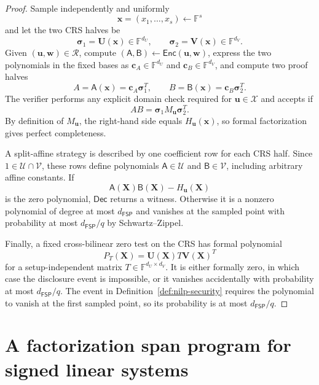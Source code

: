 \documentclass[11pt]{article}
\theoremstyle{definition}
\newcommand{\F}{\mathbb F}
\newcommand{\cR}{\mathcal R}
\newcommand{\cU}{\mathcal U}
\newcommand{\cV}{\mathcal V}
\newcommand{\FSP}{\mathsf{FSP}}
\newcommand{\Enc}{\mathsf{Enc}}
\newcommand{\Dec}{\mathsf{Dec}}
\begin{document}
\begin{proof}
Sample independently and uniformly
\[
  \mathbf x=(x_1,\ldots,x_s)\leftarrow\F^s
\]
and let the two CRS halves be
\begin{equation}
  \boldsymbol{\sigma}_1=\mathbf U(\mathbf x)\in \F^{d_U},
  \qquad
  \boldsymbol{\sigma}_2=\mathbf V(\mathbf x)\in \F^{d_V}.
  \label{eq:generic-fsp-crs}
\end{equation}
Given $(\mathbf u,\mathbf w)\in\cR$, compute 
$(\mathsf A,\mathsf B)\leftarrow\Enc(\mathbf u,\mathbf w)$, express the two
polynomials in the fixed bases as $\mathbf c_A\in \F^{d_U}$ and
$\mathbf c_B\in \F^{d_V}$, and compute two proof halves
\begin{equation}
  A=\mathsf A(\mathbf x)=\mathbf c_A\boldsymbol{\sigma}_1^T,
  \qquad
  B=\mathsf B(\mathbf x)=\mathbf c_B\boldsymbol{\sigma}_2^T.
  \label{eq:generic-fsp-proof}
\end{equation}
The verifier performs any explicit domain check required for
$\mathbf u\in\mathcal X$ and accepts if
\begin{equation}
  AB=\boldsymbol{\sigma}_1M_{\mathbf u}\boldsymbol{\sigma}_2^T.
  \label{eq:generic-fsp-verifier}
\end{equation}
By definition of $M_{\mathbf u}$, the right-hand side equals
$H_{\mathbf u}(\mathbf x)$, so formal factorization gives perfect
completeness.

A split-affine strategy is described by one coefficient row for each CRS
half.  Since $1\in\cU\cap\cV$, these rows define polynomials
$\mathsf A\in\cU$ and $\mathsf B\in\cV$, including arbitrary affine
constants.  If
\[
  \mathsf A(\mathbf X)\mathsf B(\mathbf X)-H_{\mathbf u}(\mathbf X)
\]
is the zero polynomial, $\Dec$ returns a witness.  Otherwise it is a nonzero
polynomial of degree at most $d_{\FSP}$ and vanishes at the sampled point with
probability at most $d_{\FSP}/q$ by Schwartz--Zippel.

Finally, a fixed cross-bilinear zero test on the CRS has formal polynomial
\[
  P_T(\mathbf X)=\mathbf U(\mathbf X)T\mathbf V(\mathbf X)^T
\]
for a setup-independent matrix $T\in \F^{d_U\times d_V}$.  It is either
formally zero, in which case the disclosure event is impossible, or it
vanishes accidentally with probability at most $d_{\FSP}/q$.  The event in
Definition~\ref{def:nilp-security} requires the polynomial to vanish at the
first sampled point, so its probability is at most $d_{\FSP}/q$.
\end{proof}

\section{A factorization span program for signed linear systems}
\label{sec:concrete-fsp}
\end{document}
